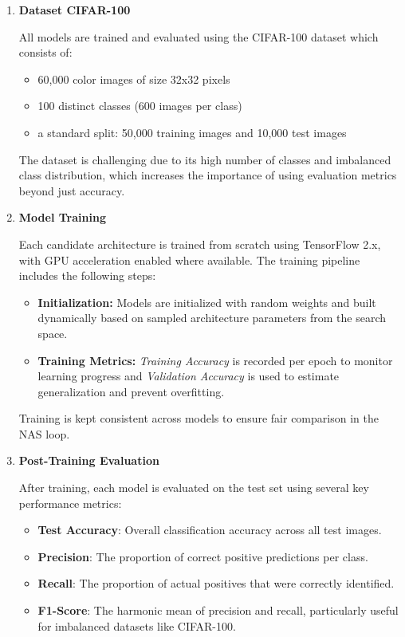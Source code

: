 \begin{enumerate}

    \item \textbf{Dataset CIFAR-100}
    
    All models are trained and evaluated using the CIFAR-100 dataset which consists of:
\begin{itemize}
    \item 60,000 color images of size 32x32 pixels
    \item 100 distinct classes (600 images per class)
\item a standard split: 50,000 training images and 10,000 test images

\end{itemize}
The dataset is challenging due to its high number of classes and imbalanced class distribution, which increases the importance of using evaluation metrics beyond just accuracy.
    \item \textbf{Model Training}
    
    Each candidate architecture is trained from scratch using TensorFlow 2.x, with GPU acceleration enabled where available. The training pipeline includes the following steps:
\begin{itemize}
    \item \textbf{Initialization:} Models are initialized with random weights and built dynamically based on sampled architecture parameters from the search space.
    \item \textbf{Training Metrics:} \textit{Training Accuracy} is recorded per epoch to monitor learning progress and \textit{Validation Accuracy} is used to estimate generalization and prevent overfitting.

\end{itemize}

Training is kept consistent across models to ensure fair comparison in the NAS loop.
\item \textbf{Post-Training Evaluation}

After training, each model is evaluated on the test set using several key performance metrics: 
\begin{itemize}
    \item \textbf{Test Accuracy}: Overall classification accuracy across all test images.
    \item \textbf{Precision}: The proportion of correct positive predictions per class.
    \item \textbf{Recall}: The proportion of actual positives that were correctly identified.
    \item \textbf{F1-Score}: The harmonic mean of precision and recall, particularly useful for imbalanced datasets like CIFAR-100.



\end{itemize}
\end{enumerate}
